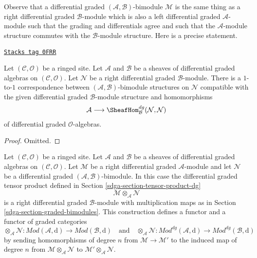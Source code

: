 \medskip\noindent
Observe that a differential graded $(\mathcal{A}, \mathcal{B})$-bimodule
$\mathcal{M}$ is the same thing as a right differential graded
$\mathcal{B}$-module which is also a left differential graded
$\mathcal{A}$-module such that the grading and differentials agree
and such that the $\mathcal{A}$-module structure commutes with
the $\mathcal{B}$-module structure. Here is a precise statement.

\begin{lemma}
\label{sdga-lemma-what-makes-a-bimodule-dg}
\href{https://stacks.math.columbia.edu/tag/0FRR}{\texttt{Stacks tag 0FRR}}

Let $(\mathcal{C}, \mathcal{O})$ be a ringed site. Let $\mathcal{A}$
and $\mathcal{B}$ be a sheaves of differential graded algebras on
$(\mathcal{C}, \mathcal{O})$. Let $\mathcal{N}$ be a right differential
graded $\mathcal{B}$-module. There is a $1$-to-$1$ correspondence
between $(\mathcal{A}, \mathcal{B})$-bimodule structures on
$\mathcal{N}$ compatible with the given
differential graded $\mathcal{B}$-module structure and homomorphisms
$$
\mathcal{A}
\longrightarrow
\SheafHom^{dg}_\mathcal{B}(\mathcal{N}, \mathcal{N})
$$
of differential graded $\mathcal{O}$-algebras.
\end{lemma}

\begin{proof}
Omitted.
\end{proof}

Let $(\mathcal{C}, \mathcal{O})$ be a ringed site. Let $\mathcal{A}$
and $\mathcal{B}$ be a sheaves of differential graded algebras on
$(\mathcal{C}, \mathcal{O})$. Let $\mathcal{M}$ be a right
differential graded $\mathcal{A}$-module and let $\mathcal{N}$ be a
differential graded $(\mathcal{A}, \mathcal{B})$-bimodule. In this case the
differential graded tensor product defined in
Section \ref{sdga-section-tensor-product-dg}
$$
\mathcal{M} \otimes_\mathcal{A} \mathcal{N}
$$
is a right differential graded $\mathcal{B}$-module with
multiplication maps as in Section \ref{sdga-section-graded-bimodules}.
This construction defines a functor and a functor of graded categories
$$
\otimes_\mathcal{A} \mathcal{N} :
\textit{Mod}(\mathcal{A}, \text{d})
\longrightarrow
\textit{Mod}(\mathcal{B}, \text{d})
\quad\text{and}\quad
\otimes_\mathcal{A} \mathcal{N} :
\textit{Mod}^{dg}(\mathcal{A}, \text{d})
\longrightarrow
\textit{Mod}^{dg}(\mathcal{B}, \text{d})
$$
by sending homomorphisms of degree $n$ from $\mathcal{M} \to \mathcal{M}'$
to the induced map of degree $n$ from
$\mathcal{M} \otimes_\mathcal{A} \mathcal{N}$ to
$\mathcal{M}' \otimes_\mathcal{A} \mathcal{N}$.

